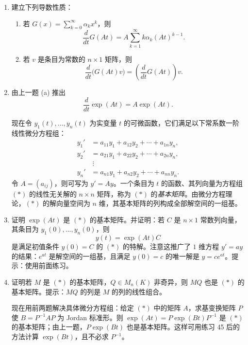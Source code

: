 \begin{enumerate}[label=\arabic*.]
\item 建立下列导数性质：
\begin{enumerate}[label=(\alph*)]
\item 若 $G(x)=\sum_{k=0}^\infty \alpha_kx^k$，则
\[
\frac{d}{dt}G(At)=A\sum_{k=1}^\infty k\alpha_k(At)^{k-1}.
\]
\item 若 $v$ 是条目为常数的 $n\times1$ 矩阵，则
\[
\frac{d}{dt}\bigl(G(At)v\bigr)=\left(\frac{d}{dt}G(At)\right)v.
\]
\end{enumerate}

\item 由上一题 (a) 推出
\[
\frac{d}{dt}\exp(At)=A\exp(At).
\]

现在令 $y_1(t),
\ldots,y_n(t)$ 为实变量 $t$ 的可微函数，它们满足以下常系数一阶线性微分方程组：
\[
\begin{aligned}
y_1'&=a_{11}y_1+a_{12}y_2+\cdots+a_{1n}y_n,\\
y_2'&=a_{21}y_1+a_{22}y_2+\cdots+a_{2n}y_n,\\
&\ \vdots\\
y_n'&=a_{n1}y_1+a_{n2}y_2+\cdots+a_{nn}y_n.
\end{aligned}\tag{$*$}
\]
令 $A=(a_{ij})$，则可写为 $y'=Ay$。一个条目为 $t$ 的函数、其列向量为方程组 $(*)$ 的线性无关解的 $n\times n$ 矩阵，称为 $(*)$ 的\emph{基本矩阵}。由微分方程理论，$(*)$ 的解向量空间为 $n$ 维，其基本矩阵的列构成全部解空间的一组基。

\item 证明 $\exp(At)$ 是 $(*)$ 的基本矩阵。并证明：若 $C$ 是 $n\times1$ 常数列向量，其条目为 $y_1(0),
\ldots,y_n(0)$，则
\[
y(t)=\exp(At)C
\]
是满足初值条件 $y(0)=C$ 的 $(*)$ 的特解。注意这推广了 $1$ 维方程 $y'=ay$ 的结果：$e^{at}$ 是解空间的一组基，且满足 $y(0)=c$ 的唯一解是 $y=ce^{at}$。提示：使用前面练习。

\item 证明若 $M$ 是 $(*)$ 的基本矩阵，$Q\in M_n(K)$ 非奇异，则 $MQ$ 也是 $(*)$ 的基本矩阵。提示：$MQ$ 的列是 $M$ 的列的线性组合。

现在用前两题解决具体微分方程组：给定 $(*)$ 中的矩阵 $A$，求基变换矩阵 $P$ 使 $B=P^{-1}AP$ 为 Jordan 标准形。则 $\exp(At)=P\exp(Bt)P^{-1}$ 是 $(*)$ 的基本矩阵；由上一题，$P\exp(Bt)$ 也是基本矩阵。这样可用练习 45 后的方法计算 $\exp(Bt)$，且不必求 $P^{-1}$。


\end{enumerate}
